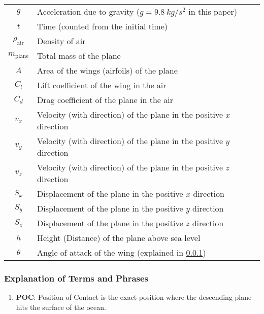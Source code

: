 \documentclass[a4paper,11pt]{article}
\begin{document}
\begin{spacing}{1.0}
\begin{center}
\begin{longtable}{cl}
		$g$ & Acceleration due to gravity ($g = 9.8 ~\unit{kg/s^2}$ in this paper) \\
		$t$ & Time (counted from the initial time) \\
		$\rho_\text{air}$ & Density of air \\
		$m_\text{plane}$ & Total mass of the plane \\
		$A$ & Area of the wings (airfoils) of the plane \\
		$C_l$ & Lift coefficient of the wing in the air \\
		$C_d$ & Drag coefficient of the plane in the air \\
		$v_x$ & Velocity (with direction) of the plane in the positive $x$ direction \\
		$v_y$ & Velocity (with direction) of the plane in the positive $y$ direction \\
		$v_z$ & Velocity (with direction) of the plane in the positive $z$ direction \\
		$S_x$ & Displacement of the plane in the positive $x$ direction \\
		$S_y$ & Displacement of the plane in the positive $y$ direction \\
		$S_z$ & Displacement of the plane in the positive $z$ direction \\
		$h$ & Height (Distance) of the plane above sea level \\
		$\theta$ & Angle of attack of the wing (explained in \ref*{Terms def I})
							
	\end{longtable}  	
\end{center}
 

\subsubsection{Explanation of Terms and Phrases}\label{Terms def I}
\begin{enumerate}
	\item \textbf{POC}: Position of Contact is the exact position where the descending plane hits the surface of the ocean.
	

\end{enumerate}
\end{spacing}
\end{document}
